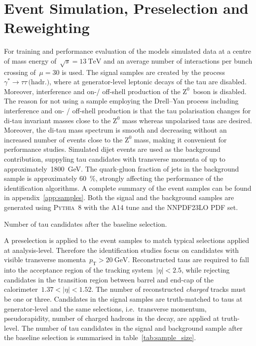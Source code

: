\section{Event Simulation, Preselection and Reweighting}
\label{sec:bdt_eventsim}

For training and performance evaluation of the models simulated data at a centre
of mass energy of~$\sqrt{s} = \SI{13}{\TeV}$ and an average number of
interactions per bunch crossing of~$\mu = \num{30}$ is used. The signal samples
are created by the process~$\gamma^* \to \tau \tau \, \text{(hadr.)}$, where at
generator-level leptonic decays of the tau are disabled. Moreover, interference
and on-/ off-shell production of the $\text{Z}^0$~boson is disabled. The reason
for not using a sample employing the Drell--Yan process including interference
and on- / off-shell production is that the tau polarisation changes for di-tau
invariant masses close to the $\text{Z}^0$ mass whereas unpolarised taus are
desired. Moreover, the di-tau mass spectrum is smooth and decreasing without an
increased number of events close to the $\text{Z}^0$ mass, making it convenient
for performance studies. Simulated dijet events are used as the background
contribution, suppyling tau candidates with transverse momenta of up to
approximately~\SI{1800}{\GeV}. The quark-gluon fraction of jets in the
background sample is approximately \SI{60}{\percent}, strongly affecting the
performance of the identification algorithms. A complete summary of the event
samples can be found in appendix~\ref{app:samples}. Both the signal and the
background samples are generated using \textsc{Pythia}~8 with the A14 tune and
the NNPDF23LO PDF set. %

\begin{table}[htb]
  \centering
  {\small}
  \caption{Number of tau candidates after the baseline selection.}
  \label{tab:sample_size}
\end{table}

A preselection is applied to the event samples to match typical selections
applied at analysis-level. Therefore the identification studies focus on
candidates with visible transverse
momenta~$p_\text{T} > \SI{20}{\giga\electronvolt}$. Reconstructed taus are
required to fall into the acceptance region of the tracking
system~$|\eta| < 2.5$, while rejecting candidates in the transition region
between barrel and end-cap of the calorimeter~\mbox{$1.37 < |\eta| < 1.52$}. The
number of reconstructed \emph{charged} tracks must be one or three. Candidates
in the signal samples are truth-matched to taus at generator-level and the same
selections, i.e.\ transverse momentum, pseudorapidity, number of charged hadrons
in the decay, are applied at truth-level. The number of tau candidates in the
signal and background sample after the baseline selection is summarised in
table~\ref{tab:sample_size}.

